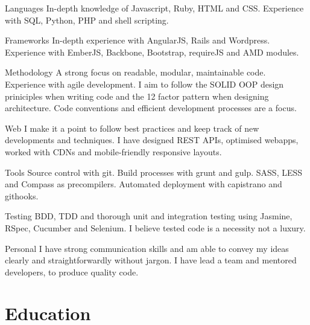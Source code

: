 \documentclass[11pt,a4paper,sans]{moderncv}        %
\begin{document}
\vspace{6pt}

\cvline
{\textcolor{light}{Languages}}
{In-depth knowledge of Javascript, Ruby, HTML and CSS. Experience with SQL, Python, PHP and shell scripting.}

\vspace{6pt}

\cvline
{\textcolor{light}{Frameworks}}
{In-depth experience with AngularJS, Rails and Wordpress. Experience with EmberJS, Backbone, Bootstrap, requireJS and AMD modules.}

\vspace{6pt}

\cvline
{\textcolor{light}{Methodology}}
{A strong focus on readable, modular, maintainable code. Experience with agile development. I aim to follow the SOLID OOP design priniciples when writing code and the 12 factor pattern when designing architecture. Code conventions and efficient development processes are a focus.}

\vspace{6pt}

\cvline
{\textcolor{light}{Web}}
{I make it a point to follow best practices and keep track of new developments and techniques. I have designed REST APIs, optimised webapps, worked with CDNs and mobile-friendly responsive layouts.}


\vspace{6pt}

\cvline
{\textcolor{light}{Tools}}
{Source control with git. Build processes with grunt and gulp. SASS, LESS and Compass as precompilers. Automated deployment with capistrano and githooks.}

\vspace{6pt}

\cvline
{\textcolor{light}{Testing}}
{BDD, TDD and thorough unit and integration testing using Jasmine, RSpec, Cucumber and Selenium. I believe tested code is a necessity not a luxury.}

\vspace{6pt}

\cvline
{\textcolor{light}{Personal}}
{I have strong communication skills and am able to convey my ideas clearly and straightforwardly without jargon. I have lead a team and mentored developers, to produce quality code.}

\vspace{6pt}

\section{Education}
\end{document}
